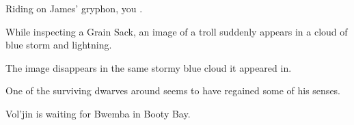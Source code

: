 Riding on James' gryphon, you .











 While inspecting a Grain Sack, an image of a troll suddenly appears in a cloud of blue storm and lightning.



The image disappears in the same stormy blue cloud it appeared in.  %



One of the surviving dwarves around seems to have regained some of his senses.


 Vol'jin is waiting for Bwemba in Booty Bay.  %




